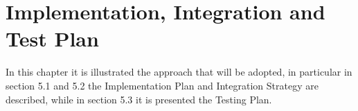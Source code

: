 \chapter{Implementation, Integration and Test Plan}

In this chapter it is illustrated the approach that will be adopted, in particular in section 5.1 and 5.2 the Implementation Plan and Integration Strategy are described, while in section 5.3 it is presented the Testing Plan.



